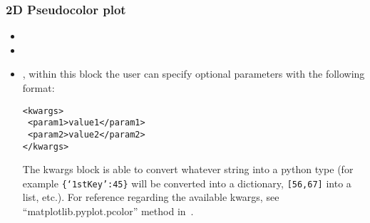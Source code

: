 \subsubsection{2D Pseudocolor plot}
  \begin{itemize}
    \item \interpolationDescription[linear]
    \item {}
    \item {}, within this block the user can specify optional
    parameters with the following format:

\begin{lstlisting}[style=XML]
<kwargs>
 <param1>value1</param1>
 <param2>value2</param2>
</kwargs>
\end{lstlisting}
  The kwargs block is able to convert whatever string into a python type (for
  example  \texttt{\{`1stKey':45\}} will
  be converted into a dictionary,
   \texttt{[56,67]}  into a list, etc.).
    For reference regarding the available kwargs, see
    ``matplotlib.pyplot.pcolor'' method in~\cite{MatPlotLib}.
  \end{itemize}

